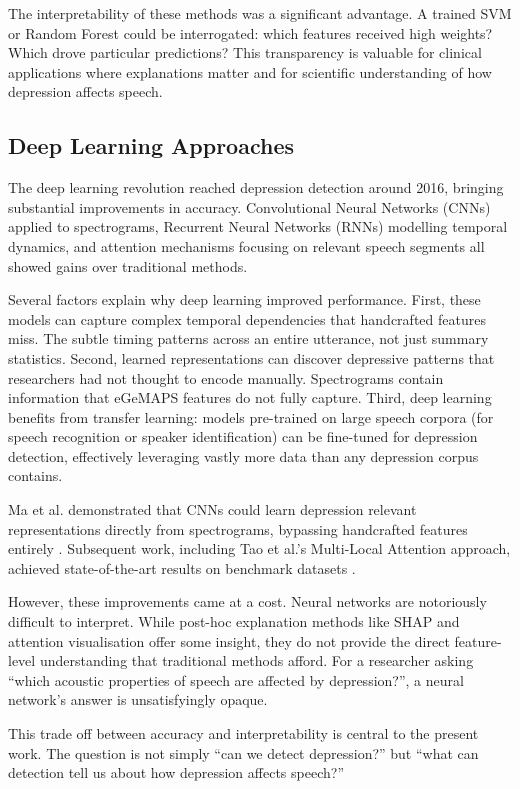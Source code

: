 The interpretability of these methods was a significant advantage. A trained SVM or Random Forest could be interrogated: which features received high weights? Which drove particular predictions? This transparency is valuable for clinical applications where explanations matter and for scientific understanding of how depression affects speech.

\subsection{Deep Learning Approaches}

The deep learning revolution reached depression detection around 2016, bringing substantial improvements in accuracy. Convolutional Neural Networks (CNNs) applied to spectrograms, Recurrent Neural Networks (RNNs) modelling temporal dynamics, and attention mechanisms focusing on relevant speech segments all showed gains over traditional methods.

Several factors explain why deep learning improved performance. First, these models can capture complex temporal dependencies that handcrafted features miss. The subtle timing patterns across an entire utterance, not just summary statistics. Second, learned representations can discover depressive patterns that researchers had not thought to encode manually. Spectrograms contain information that eGeMAPS features do not fully capture. Third, deep learning benefits from transfer learning: models pre-trained on large speech corpora (for speech recognition or speaker identification) can be fine-tuned for depression detection, effectively leveraging vastly more data than any depression corpus contains.

Ma et al. demonstrated that CNNs could learn depression relevant representations directly from spectrograms, bypassing handcrafted features entirely \cite{Ma2016}. Subsequent work, including Tao et al.'s Multi-Local Attention approach, achieved state-of-the-art results on benchmark datasets \cite{Tao2023MLA}.

However, these improvements came at a cost. Neural networks are notoriously difficult to interpret. While post-hoc explanation methods like SHAP and attention visualisation offer some insight, they do not provide the direct feature-level understanding that traditional methods afford. For a researcher asking ``which acoustic properties of speech are affected by depression?'', a neural network's answer is unsatisfyingly opaque.

This trade off between accuracy and interpretability is central to the present work. The question is not simply ``can we detect depression?'' but ``what can detection tell us about how depression affects speech?''

